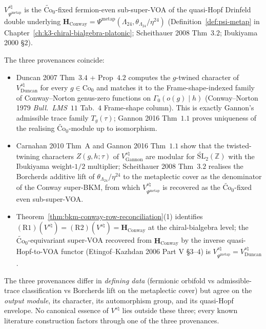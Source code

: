 \begin{theorem}
\begin{enumerate}[label=\textup{(P\arabic*)}]
$V^{s\natural}_{\Psi^{\mathrm{metap}}}$ is the
$\widetilde{\mathrm{Co}}_0$-fixed fermion-even sub-super-VOA of the
quasi-Hopf Drinfeld double underlying
$\mathbf{H}_{\mathrm{Conway}} =
\Psi^{\mathrm{metap}}(\Lambda_{24},\theta_{\Lambda_{24}}/\eta^{24})$
(Definition~\ref{def:psi-metap} in
Chapter~\ref{ch:k3-chiral-bialgebra-platonic};
Scheithauer 2008 Thm~$3.2$; Ibukiyama 2000 \S$2$).
\end{enumerate}
The three provenances coincide:
\begin{itemize}
\item[\textup{(P1$\leftrightarrow$P2)}]
Duncan 2007 Thm~$3.4$ + Prop~$4.2$ computes the $g$-twined
character of $V^{s\natural}_{\mathrm{Duncan}}$ for every
$g\in\mathrm{Co}_0$ and matches it to the Frame-shape-indexed
family of Conway--Norton genus-zero functions on
$\Gamma_0(o(g)\mid h)$
(Conway--Norton 1979 \emph{Bull.~LMS}~$11$ Tab.~$4$ Frame-shape
column). This is exactly Gannon's admissible trace family
$T_g(\tau)$; Gannon 2016 Thm~$1.1$ proves uniqueness of the
realising $\widetilde{\mathrm{Co}}_0$-module up to isomorphism.
\item[\textup{(P2$\leftrightarrow$P3)}]
Carnahan 2010 Thm~A and Gannon 2016 Thm~$1.1$ show that the
twisted-twining characters $Z(g, h; \tau)$ of
$V^{s\natural}_{\mathrm{Gannon}}$ are modular for
$\widetilde{\mathrm{SL}}_2(\mathbb{Z})$ with the Ibukiyama
weight-$1/2$ multiplier; Scheithauer 2008 Thm~$3.2$ realises
the Borcherds additive lift of
$\theta_{\Lambda_{24}}/\eta^{24}$ to the metaplectic cover as
the denominator of the Conway super-BKM, from which
$V^{s\natural}_{\Psi^{\mathrm{metap}}}$ is recovered as the
$\widetilde{\mathrm{Co}}_0$-fixed even sub-super-VOA.
\item[\textup{(P1$\leftrightarrow$P3)}]
Theorem~\ref{thm:bkm-conway-row-reconciliation}\textup{(1)}
identifies $(\mathrm{R1})(V^{s\natural}) =
(\mathrm{R2})(V^{s\natural}) = \mathbf{H}_{\mathrm{Conway}}$ at
the chiral-bialgebra level; the
$\widetilde{\mathrm{Co}}_0$-equivariant super-VOA recovered from
$\mathbf{H}_{\mathrm{Conway}}$ by the inverse quasi-Hopf-to-VOA
functor (Etingof--Kazhdan 2006 Part V \S$3$--$4$) is
$V^{s\natural}_{\Psi^{\mathrm{metap}}} =
V^{s\natural}_{\mathrm{Duncan}}$.
\end{itemize}
The three provenances differ in \emph{defining data} (fermionic
orbifold vs admissible-trace classification vs Borcherds lift on
the metaplectic cover) but agree on the \emph{output module},
its character, its automorphism group, and its quasi-Hopf
envelope. No canonical essence of $V^{s\natural}$ lies outside
these three; every known literature construction factors through
one of the three provenances.
\end{theorem}

